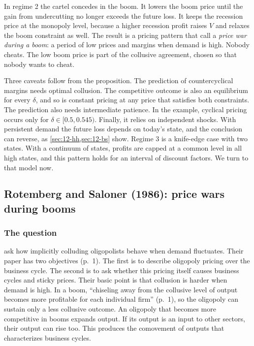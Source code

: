 In regime 2 the cartel concedes in the boom. It lowers the boom price until the gain from undercutting no longer
exceeds the future loss. It keeps the recession price at the monopoly level, because a higher recession profit
raises $V$ and relaxes the boom constraint as well. The result is a pricing pattern that \citet{RotembergSaloner1986}
call a \emph{price war during a boom}: a period of low prices and margins when demand is high. Nobody cheats. The low
boom price is part of the collusive agreement, chosen so that nobody wants to cheat.

Three caveats follow from the proposition. The prediction of countercyclical margins needs optimal collusion. The
competitive outcome is also an equilibrium for every $\delta$, and so is constant pricing at any price that satisfies
both constraints. The prediction also needs intermediate patience. In the example, cyclical pricing occurs only for
$\delta \in [0.5, 0.545)$. Finally, it relies on independent shocks. With persistent demand the future loss depends on
today's state, and the conclusion can reverse, as \cref{sec:12-hh,sec:12-bs} show. Regime 3 is a knife-edge case
with two states. With a continuum of states, profits are capped at a common level in all high states, and this
pattern holds for an interval of discount factors. We turn to that model now.

\subsection{Rotemberg and Saloner (1986): price wars during booms}\label{sec:12-rs}

\subsubsection{The question}

\citet{RotembergSaloner1986} ask how implicitly colluding oligopolists behave when demand fluctuates. Their paper has
two objectives (p.~1). The first is to describe oligopoly pricing over the business cycle. The second is to ask
whether this pricing itself causes business cycles and sticky prices. Their basic point is that collusion is harder
when demand is high. In a boom, ``chiseling away from the collusive level of output becomes more profitable for each
individual firm'' (p.~1), so the oligopoly can sustain only a less collusive outcome. An oligopoly that becomes more
competitive in booms expands output. If its output is an input to other
sectors, their output can rise too. This produces the comovement of outputs that characterizes business cycles.

